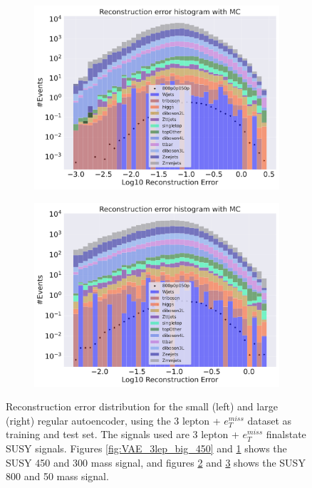 \begin{figure}[H]
\begin{subfigure}{.45\textwidth}
        \caption{}
        \label{fig:VAE_3lep_small_450}
    \end{subfigure}
    \hfill
    \begin{subfigure}{.45\textwidth}
        \includegraphics[width=\textwidth]{Figures/VAE_testing/big/3lep/b_data_recon_big_rm3_feats_sig_800p0p050p.pdf}
        \caption{}
        \label{fig:VAE_3lep_big_800}
    \end{subfigure}
    \hfill   
    \begin{subfigure}{.45\textwidth}
        \includegraphics[width=\textwidth]{Figures/VAE_testing/small/3lep/b_data_recon_big_rm3_feats_sig_800p0p050p.pdf}
        \caption{}
        \label{fig:VAE_3lep_small_800}
    \end{subfigure}
    \hfill      
    \caption[3lep reconstruction error with SUSY signals for VAE]{Reconstruction error distribution for the small (left) and large (right)
    regular autoencoder, using the 3 lepton + $e_T^{miss}$ dataset as training and test set. The signals used are 3 lepton + $e_T^{miss}$ 
    finalstate SUSY signals. Figures \ref{fig:VAE_3lep_big_450} and \ref{fig:VAE_3lep_small_450} shows the SUSY 450 and 300 mass signal, 
    and figures \ref{fig:VAE_3lep_big_800} and \ref{fig:VAE_3lep_small_800} shows the SUSY 800 and 50 mass signal.}
    \label{fig:VAE_3lep_recon_err_both_sig}
\end{figure}

